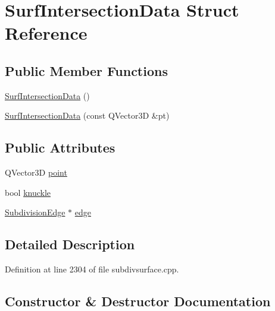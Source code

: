 \hypertarget{structSurfIntersectionData}{}\section{Surf\+Intersection\+Data Struct Reference}
\label{structSurfIntersectionData}
\subsection*{Public Member Functions}
\begin{DoxyCompactItemize}
\item 
\hyperlink{structSurfIntersectionData_a03090412914ee528d438e2a209ba0b84}{Surf\+Intersection\+Data} ()
\item 
\hyperlink{structSurfIntersectionData_a873573cfa09f308be70a6c7f77b85829}{Surf\+Intersection\+Data} (const Q\+Vector3D \&pt)
\end{DoxyCompactItemize}
\subsection*{Public Attributes}
\begin{DoxyCompactItemize}
\item 
Q\+Vector3D \hyperlink{structSurfIntersectionData_a789d1758e7035fdf5b902861e936113a}{point}
\item 
bool \hyperlink{structSurfIntersectionData_aa0424f338bde27885e800c649d436c52}{knuckle}
\item 
\hyperlink{classShipCAD_1_1SubdivisionEdge}{Subdivision\+Edge} $\ast$ \hyperlink{structSurfIntersectionData_a31e44618f1b59ddee1aef3dcff15fa6e}{edge}
\end{DoxyCompactItemize}


\subsection{Detailed Description}


Definition at line 2304 of file subdivsurface.\+cpp.



\subsection{Constructor \& Destructor Documentation}
